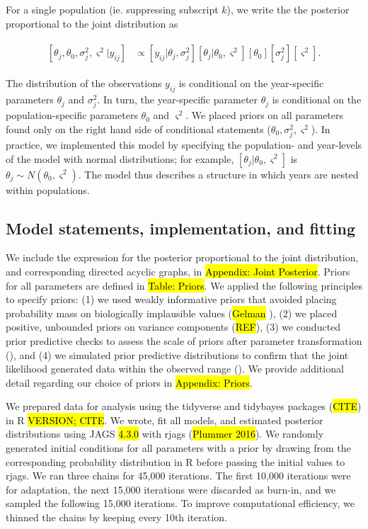 \documentclass[12pt, oneside]{article}   	%
\begin{document}
For a single population (ie. suppressing subscript $k$), we write the the posterior proportional to the joint distribution as

\begin{align}
  \begin{split}
  [ \theta_j , \theta_0 , \sigma_j^2 , \varsigma^2 | y_{ij} ] &  \propto [ y_{ij} | \theta_j , \sigma^2_j] [ \theta_j | \theta_0 , \varsigma^2 ] [ \theta_0 ] [ \sigma^2_j] [ \varsigma^2].
  \end{split}
\end{align}

The distribution of the observations $y_{ij}$ is conditional on the year-specific parameters $\theta_j$ and $\sigma^2_j$. In turn, the year-specific parameter $\theta_j$ is conditional on the population-specific parameters $\theta_0$ and $ \varsigma^2$. We placed priors on all parameters found only on the right hand side of conditional statements ($\theta_0, \sigma^2_j, \varsigma^2$). In practice, we implemented this model by specifying the population- and year-levels of the model with normal distributions; for example, $[ \theta_j | \theta_0 , \varsigma^2 ]$ is $\theta_j \sim N(\theta_0, \varsigma^2)$. The model thus describes a structure in which years are nested within populations.

\subsection{Model statements, implementation, and fitting}

We include the expression for the posterior proportional to the joint distribution, and corresponding directed acyclic graphs, in \hl{Appendix: Joint Posterior}. Priors for all parameters are defined in \hl{Table: Priors}. We applied the following principles to specify priors: (1) we used weakly informative priors that avoided placing probability mass on biologically implausible values (\hl{Gelman} \cite{lemoine2019,wesner2020}), (2) we placed positive, unbounded priors on variance components (\hl{REF}), (3) we conducted prior predictive checks to assess the scale of priors after parameter transformation (\cite{hobbs2015b,gabry2019,wesner2020}), and (4) we simulated prior predictive distributions to confirm that the joint likelihood generated data within the observed range (\cite{gabry2019,conn2018,hobbs2015b}). We provide additional detail regarding our choice of priors in \hl{Appendix: Priors}. 

We prepared data for analysis using the tidyverse and tidybayes packages (\hl{CITE}) in R \hl{VERSION; CITE}. We wrote, fit all models, and estimated posterior distributions using JAGS \hl{4.3.0} with rjags (\hl{Plummer 2016}). We randomly generated initial conditions for all parameters with a prior by drawing from the corresponding probability distribution in R before passing the initial values to rjags. We ran three chains for 45,000 iterations. The first 10,000 iterations were for adaptation, the next 15,000 iterations were discarded as burn-in, and we sampled the following 15,000 iterations. To improve computational efficiency, we thinned the chains by keeping every 10th iteration.
\end{document}
